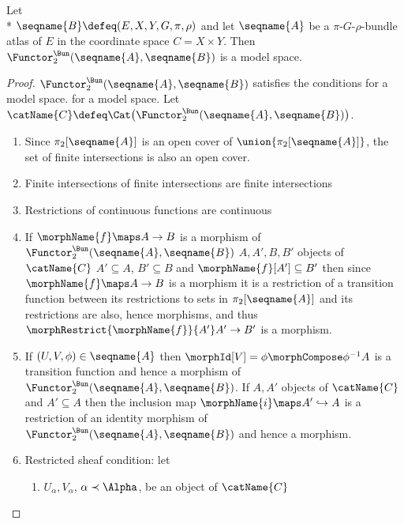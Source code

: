 \documentclass{article}
\begin{document}
\begin{lemma}
{
  \showlabelsinline
  \label{lem:ismodBF}
}
Let \\*
$
  \seqname{B}
  \defeq
  (
    E,
    X,
    Y,
    G,
    \pi,
    \rho
  )
$
and let $\seqname{A}$ be a $\pi$-$G$-$\rho$-bundle atlas of $E$ in the
coordinate space $C = X \times Y$. Then
$\Functor^\Bun_2 (\seqname{A}, \seqname{B})$ is a model space.

\begin{proof}
$\Functor^\Bun_2 (\seqname{A}, \seqname{B})$ satisfies the
conditions for a model space.
for a model space. Let
$
  \catName{C} \defeq
  \Cat \bigl ( \Functor^\Bun_2 (\seqname{A}, \seqname{B}) \bigr )
$.
\begin{enumerate}
\item Since $\pi_2[\seqname{A}]$ is an open cover of
$\union{\pi_2[\seqname{A}]}$, the set of finite intersections is also an
open cover.

\item Finite intersections of finite intersections are finite intersections

\item Restrictions of continuous functions are continuous

\item If $\morphName{f} \maps A \to B$ is a morphism of
$\Functor^\Bun_2 (\seqname{A}, \seqname{B})$ $A, A', B, B'$ objects of
$\catName{C}$ $A' \subseteq A$, $B' \subseteq B$ and
$\morphName{f}[A'] \subseteq B'$ then since $\morphName{f} \maps A \to B$
is a morphism it is a restriction of a transition function between its
restrictions to sets in $\pi_2[\seqname{A}]$ and its restrictions are
also, hence morphisms, and thus
$\morphRestrict{\morphName{f}}{A'} A' \to B'$ is a morphism.

\item
If $(U,V,\phi) \in \seqname{A}$ then $\morphId[{V}] = \phi \morphCompose \phi^{-1}A$
is a transition function and hence a morphism of
$\Functor^\Bun_2 (\seqname{A}, \seqname{B})$. If $A, A'$ objects of
$\catName{C}$ and
$A' \subseteq A$ then the inclusion map
$\morphName{i} \maps A' \hookrightarrow A$ is a restriction of an
identity morphism of $\Functor^\Bun_2 (\seqname{A}, \seqname{B})$ and
hence a morphism.

\item Restricted sheaf condition: let
\begin{enumerate}
\item $U_\alpha,V_\alpha$, $\alpha \prec \Alpha$, be an object of
$\catName{C}$


\end{enumerate}
\end{enumerate}
\end{proof}
\end{lemma}
\end{document}
